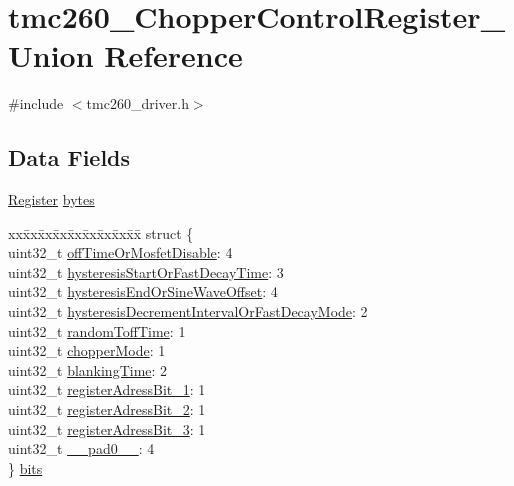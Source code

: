 \hypertarget{uniontmc260___chopper_control_register__}{}\section{tmc260\+\_\+\+Chopper\+Control\+Register\+\_\+ Union Reference}
\label{uniontmc260___chopper_control_register__}


{\ttfamily \#include $<$tmc260\+\_\+driver.\+h$>$}

\subsection*{Data Fields}
\begin{DoxyCompactItemize}
\item 
\mbox{\hyperlink{tmc260__driver_8h_a280b01a3b5bb4294fcee278b00c030d6}{Register}} \mbox{\hyperlink{uniontmc260___chopper_control_register___a445b72174063a88455cd86c22d77d03f}{bytes}}
\item 
\begin{tabbing}
xx\=xx\=xx\=xx\=xx\=xx\=xx\=xx\=xx\=\kill
struct \{\\
\>uint32\_t \mbox{\hyperlink{uniontmc260___chopper_control_register___ac823d0b0cbdcb4f8b362cdba9d912ee2}{offTimeOrMosfetDisable}}: 4\\
\>uint32\_t \mbox{\hyperlink{uniontmc260___chopper_control_register___ac2d01ebf0d937be909c0f2daf54d3b6a}{hysteresisStartOrFastDecayTime}}: 3\\
\>uint32\_t \mbox{\hyperlink{uniontmc260___chopper_control_register___a6299a53ed5b8d4d016816293d2cafce2}{hysteresisEndOrSineWaveOffset}}: 4\\
\>uint32\_t \mbox{\hyperlink{uniontmc260___chopper_control_register___ac4ee7b51371e5f076bf691c71e679d2f}{hysteresisDecrementIntervalOrFastDecayMode}}: 2\\
\>uint32\_t \mbox{\hyperlink{uniontmc260___chopper_control_register___a1cedcadd3f5e38a49f24d07c4cb75886}{randomToffTime}}: 1\\
\>uint32\_t \mbox{\hyperlink{uniontmc260___chopper_control_register___a00949da3a97cb42796ef2161cd0817bc}{chopperMode}}: 1\\
\>uint32\_t \mbox{\hyperlink{uniontmc260___chopper_control_register___af5b56d8dbfe1afbaef2fa2b6703bfa6d}{blankingTime}}: 2\\
\>uint32\_t \mbox{\hyperlink{uniontmc260___chopper_control_register___a8e58d0701295971bc3d890f5107f8aa5}{registerAdressBit\_1}}: 1\\
\>uint32\_t \mbox{\hyperlink{uniontmc260___chopper_control_register___abd6d1c957737511340b85f5c2d61f9ab}{registerAdressBit\_2}}: 1\\
\>uint32\_t \mbox{\hyperlink{uniontmc260___chopper_control_register___a3da0387ab629039b91d051ab328910f0}{registerAdressBit\_3}}: 1\\
\>uint32\_t \mbox{\hyperlink{uniontmc260___chopper_control_register___a3e57c2ef1c3ffb36722f000cc1156824}{\_\_pad0\_\_}}: 4\\
\} \mbox{\hyperlink{uniontmc260___chopper_control_register___a4bff58b2954e71c724912bb179e34070}{bits}}\\


\end{tabbing}
\end{DoxyCompactItemize}

